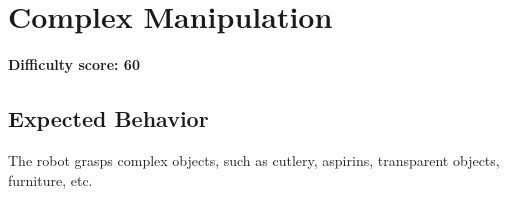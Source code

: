 \section{Complex Manipulation}

\textbf{Difficulty score: 60}

\subsection{Expected Behavior}
The robot grasps complex objects, such as cutlery, aspirins, transparent objects, furniture, etc.


